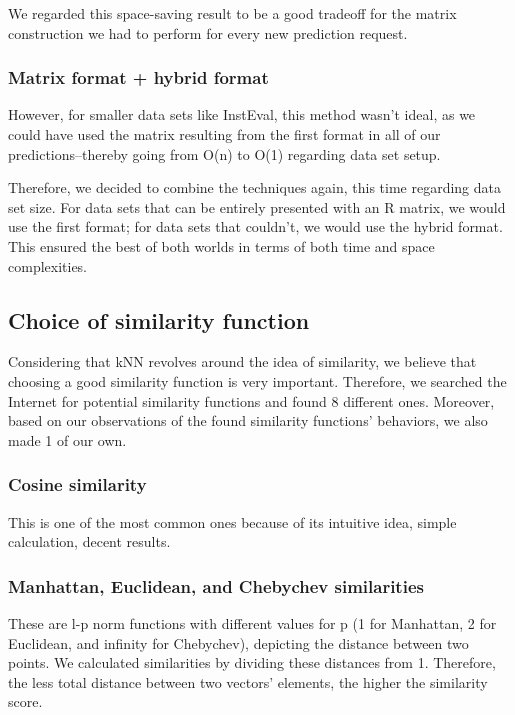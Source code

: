 \documentclass{article}
\begin{document}
We regarded this space-saving result to be a good tradeoff for the matrix construction we had to perform for every new prediction request.

\subsubsection{Matrix format + hybrid format}

However, for smaller data sets like InstEval, this method wasn't ideal, as we could have used the matrix resulting from the first format in all of our predictions--thereby going from O(n) to O(1) regarding data set setup. 

Therefore, we decided to combine the techniques again, this time regarding data set size. For data sets that can be entirely presented with an R matrix, we would use the first format; for data sets that couldn't, we would use the hybrid format. This ensured the best of both worlds in terms of both time and space complexities.

\subsection{Choice of similarity function}

Considering that kNN revolves around the idea of similarity, we believe that choosing a good similarity function is very important. Therefore, we searched the Internet for potential similarity functions and found 8 different ones. Moreover, based on our observations of the found similarity functions' behaviors, we also made 1 of our own.

\subsubsection{Cosine similarity}

This is one of the most common ones because of its intuitive idea, simple calculation, decent results.

\subsubsection{Manhattan, Euclidean, and Chebychev similarities}

These are l-p norm functions with different values for p (1 for Manhattan, 2 for Euclidean, and infinity for Chebychev), depicting the distance between two points. We calculated similarities by dividing these distances from 1. Therefore, the less total distance between two vectors' elements, the higher the similarity score. 
\end{document}
